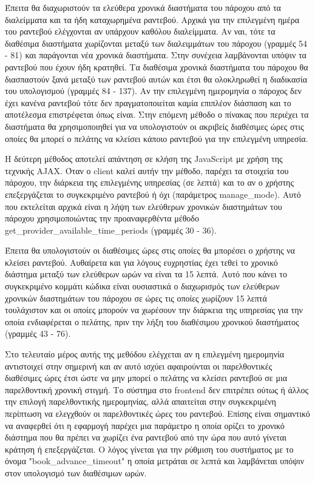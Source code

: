 Έπειτα θα διαχωριστούν τα ελεύθερα χρονικά διαστήματα του πάροχου από τα διαλείμματα και τα ήδη καταχωρημένα ραντεβού. Αρχικά για την επιλεγμένη ημέρα του ραντεβού ελέγχονται αν υπάρχουν καθόλου διαλείμματα. Αν ναι, τότε τα διαθέσιμα διαστήματα χωρίζονται μεταξύ των διαλειμμάτων του πάροχου (γραμμές 54 - 81) και παράγονται νέα χρονικά διαστήματα. Στην συνέχεια λαμβάνονται υπόψιν τα ραντεβού που έχουν ήδη κρατηθεί. Τα διαθέσιμα χρονικά διαστήματα του πάροχου θα διασπαστούν ξανά μεταξύ των ραντεβού αυτών και έτσι θα ολοκληρωθεί η διαδικασία του υπολογισμού (γραμμές 84 - 137). Αν την επιλεγμένη ημερομηνία ο πάροχος δεν έχει κανένα ραντεβού τότε δεν πραγματοποιείται καμία επιπλέον διάσπαση και το αποτέλεσμα επιστρέφεται όπως είναι. Στην επόμενη μέθοδο ο πίνακας που περιέχει τα διαστήματα θα χρησιμοποιηθεί για να υπολογιστούν οι ακριβείς διαθέσιμες ώρες στις οποίες θα μπορεί ο πελάτης να κλείσει κάποιο ραντεβού για την επιλεγμένη υπηρεσία.



Η δεύτερη μέθοδος αποτελεί απάντηση σε κλήση της JavaScript με χρήση της τεχνικής AJAX. Όταν ο client καλεί αυτήν την μέθοδο, παρέχει τα στοιχεία του πάροχου, την διάρκεια της επιλεγμένης υπηρεσίας (σε λεπτά) και το αν ο χρήστης επεξεργάζεται το συγκεκριμένο ραντεβού ή όχι (παράμετρος manage\_mode). Αυτό που εκτελείται αρχικά είναι η λήψη των ελεύθερων χρονικών διαστημάτων του πάροχου χρησιμοποιώντας την προαναφερθέντα μέθοδο get\_provider\_available\_time\_periods (γραμμές 30 - 36). 

Έπειτα θα υπολογιστούν οι διαθέσιμες ώρες στις οποίες θα μπορέσει ο χρήστης να κλείσει ραντεβού. Αυθαίρετα και για λόγους ευχρηστίας έχει τεθεί το χρονικό διάστημα μεταξύ των ελεύθερων ωρών να είναι τα 15 λεπτά. Αυτό που κάνει το συγκεκριμένο κομμάτι κώδικα είναι ουσιαστικά ο διαχωρισμός των ελεύθερων χρονικών διαστημάτων του πάροχου σε ώρες τις οποίες χωρίζουν 15 λεπτά τουλάχιστον και οι οποίες μπορούν να χωρέσουν την διάρκεια της υπηρεσίας για την οποία ενδιαφέρεται ο πελάτης, πριν την λήξη του διαθέσιμου χρονικού διαστήματος (γραμμές 43 - 76).

Στο τελευταίο μέρος αυτής της μεθόδου ελέγχεται αν η επιλεγμένη ημερομηνία αντιστοιχεί στην σημερινή και αν αυτό ισχύει αφαιρούνται οι παρελθοντικές διαθέσιμες ώρες έτσι ώστε να μην μπορεί ο πελάτης να κλείσει ραντεβού σε μια παρελθοντική χρονική στιγμή. Το σύστημα στο frontend δεν επιτρέπει ούτως ή άλλος την επιλογή παρελθοντικής ημερομηνίας, αλλά απαιτείται στην συγκεκριμένη περίπτωση να ελεγχθούν οι παρελθοντικές ώρες του ραντεβού. Επίσης είναι σημαντικό να αναφερθεί ότι η εφαρμογή παρέχει μια παράμετρο η οποία ορίζει το χρονικό διάστημα που θα πρέπει να χωρίζει ένα ραντεβού από την ώρα που αυτό γίνεται κράτηση ή επεξεργάζεται. Ο λόγος γίνεται για την ρύθμιση του συστήματος με το όνομα "book\_advance\_timeout" η οποία μετράται σε λεπτά και λαμβάνεται υπόψιν στον υπολογισμό των διαθέσιμων ωρών.

